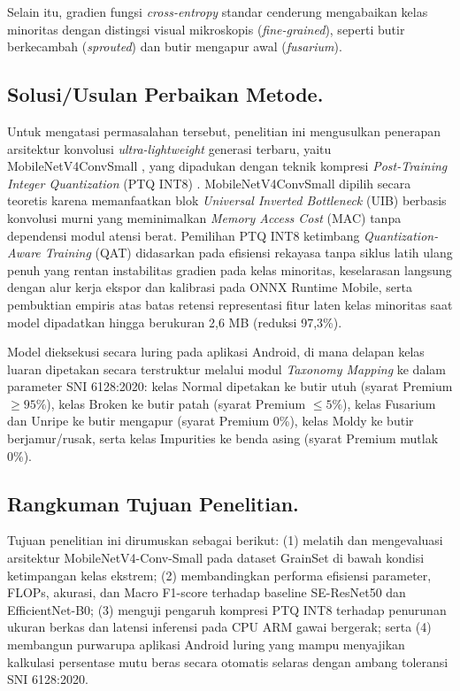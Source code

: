 \documentclass[12pt,a4paper]{article}
\begin{document}
Selain itu, gradien fungsi \textit{cross-entropy} standar cenderung mengabaikan kelas minoritas dengan distingsi visual mikroskopis (\textit{fine-grained}), 
seperti butir berkecambah (\textit{sprouted}) dan butir mengapur awal (\textit{fusarium}).

\subsection*{Solusi/Usulan Perbaikan Metode.} 

\indent Untuk mengatasi permasalahan tersebut, penelitian ini mengusulkan penerapan arsitektur konvolusi \textit{ultra-lightweight} generasi terbaru,
yaitu MobileNetV4\-Conv\-Small \autocite{qin2024mobilenetv4}, yang dipadukan dengan teknik kompresi \textit{Post-Training Integer Quantization} (PTQ INT8) \autocite{jacob2018quantization}. MobileNetV4\-Conv\-Small dipilih secara teoretis karena memanfaatkan blok \textit{Universal Inverted Bottleneck} (UIB) berbasis konvolusi murni yang meminimalkan \textit{Memory Access Cost} (MAC) tanpa dependensi modul atensi berat.
Pemilihan PTQ INT8 ketimbang \textit{Quantization-Aware Training} (QAT) didasarkan pada efisiensi rekayasa tanpa siklus latih ulang penuh yang rentan instabilitas gradien pada kelas minoritas, keselarasan langsung dengan alur kerja ekspor dan kalibrasi pada ONNX Runtime Mobile, serta pembuktian empiris atas batas retensi representasi fitur laten kelas minoritas saat model dipadatkan hingga berukuran 2,6 MB (reduksi 97,3\%).

Model dieksekusi secara luring pada aplikasi Android, di mana delapan kelas luaran dipetakan secara terstruktur melalui modul \textit{Taxonomy Mapping}
ke dalam parameter SNI 6128:2020: kelas Normal dipetakan ke butir utuh (syarat Premium $\ge 95\%$), kelas Broken ke butir patah (syarat Premium $\le 5\%$),
kelas Fusarium dan Unripe ke butir mengapur (syarat Premium 0\%), kelas Moldy ke butir berjamur/rusak, serta kelas Impurities ke benda asing (syarat Premium mutlak 0\%).

\subsection*{Rangkuman Tujuan Penelitian.} 

\indent Tujuan penelitian ini dirumuskan sebagai berikut: (1) melatih dan mengevaluasi arsitektur MobileNetV4-Conv-Small pada dataset GrainSet
di bawah kondisi ketimpangan kelas ekstrem; (2) membandingkan performa efisiensi parameter, FLOPs, akurasi, dan Macro F1-score terhadap baseline SE-ResNet50
dan EfficientNet-B0; (3) menguji pengaruh kompresi PTQ INT8 terhadap penurunan ukuran berkas dan latensi inferensi pada CPU ARM gawai bergerak; 
serta (4) membangun purwarupa aplikasi Android luring yang mampu menyajikan kalkulasi persentase mutu beras secara otomatis selaras dengan ambang toleransi SNI 6128:2020.
\end{document}
